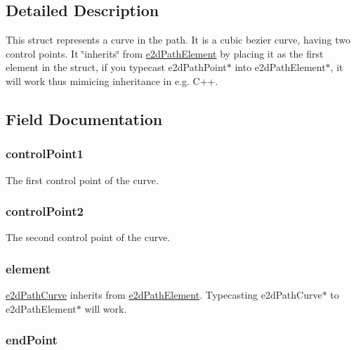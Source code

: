 \subsection{Detailed Description}
This struct represents a curve in the path. It is a cubic bezier curve, having two control points. It \char`\"{}inherits\char`\"{} from \hyperlink{structe2dPathElement}{e2d\-Path\-Element} by placing it as the first element in the struct, if you typecast e2d\-Path\-Point$\ast$ into e2d\-Path\-Element$\ast$, it will work thus mimicing inheritance in e.\-g. C++. 

\subsection{Field Documentation}
\hypertarget{structe2dPathCurve_a5fe58a06185a33704c2cc77c8a58fb0d}{
\subsubsection[{control\-Point1}]{ {\bf control\-Point1}}}\label{structe2dPathCurve_a5fe58a06185a33704c2cc77c8a58fb0d}
The first control point of the curve. \hypertarget{structe2dPathCurve_a929324aa1e3527d71e312e5f80cb24db}{
\subsubsection[{control\-Point2}]{ {\bf control\-Point2}}}\label{structe2dPathCurve_a929324aa1e3527d71e312e5f80cb24db}
The second control point of the curve. \hypertarget{structe2dPathCurve_a88e514266530010a1a3b08198b3cc763}{
\subsubsection[{element}]{ {\bf element}}}\label{structe2dPathCurve_a88e514266530010a1a3b08198b3cc763}
\hyperlink{structe2dPathCurve}{e2d\-Path\-Curve} inherits from \hyperlink{structe2dPathElement}{e2d\-Path\-Element}. Typecasting e2d\-Path\-Curve$\ast$ to e2d\-Path\-Element$\ast$ will work. \hypertarget{structe2dPathCurve_a0ae59a21d141722d36c0ebc740587f9d}{
\subsubsection[{end\-Point}]{ {\bf end\-Point}}}\label{structe2dPathCurve_a0ae59a21d141722d36c0ebc740587f9d}
